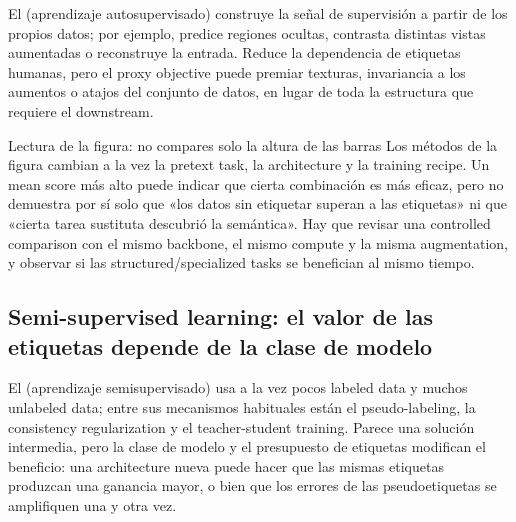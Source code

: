 El  (aprendizaje autosupervisado) construye la señal de supervisión a partir de los propios datos; por ejemplo, predice regiones ocultas, contrasta distintas vistas aumentadas o reconstruye la entrada. Reduce la dependencia de etiquetas humanas, pero el proxy objective puede premiar texturas, invariancia a los aumentos o atajos del conjunto de datos, en lugar de toda la estructura que requiere el downstream.


\begin{knowledgebox}{Lectura de la figura: no compares solo la altura de las barras}
Los métodos de la figura cambian a la vez la pretext task, la architecture y la training recipe. Un mean score más alto puede indicar que cierta combinación es más eficaz, pero no demuestra por sí solo que «los datos sin etiquetar superan a las etiquetas» ni que «cierta tarea sustituta descubrió la semántica». Hay que revisar una controlled comparison con el mismo backbone, el mismo compute y la misma augmentation, y observar si las structured/specialized tasks se benefician al mismo tiempo.
\end{knowledgebox}


\subsection{Semi-supervised learning: el valor de las etiquetas depende de la clase de modelo}

El  (aprendizaje semisupervisado) usa a la vez pocos labeled data y muchos unlabeled data; entre sus mecanismos habituales están el pseudo-labeling, la consistency regularization y el teacher-student training. Parece una solución intermedia, pero la clase de modelo y el presupuesto de etiquetas modifican el beneficio: una architecture nueva puede hacer que las mismas etiquetas produzcan una ganancia mayor, o bien que los errores de las pseudoetiquetas se amplifiquen una y otra vez.

